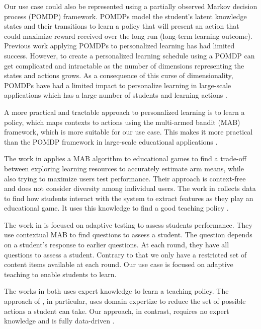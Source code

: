 \label{chapter:problem}

Our use case could also be represented using a partially observed Markov decision process (POMDP) framework. POMDPs model the student's latent knowledge states and their transitions to learn a policy that will present an action that could maximize reward received over the long run (long-term learning outcome). Previous work applying POMDPs to personalized learning has had limited success. However, to create a personalized learning schedule using a POMDP can get complicated and intractable as the number of dimensions representing the states and actions grows. As a consequence of this curse of dimensionality, POMDPs have had a limited impact to personalize learning in large-scale applications which has a large number of students and learning actions \cite{lan2016contextual}. \par 

A more practical and tractable approach to personalized learning is to learn a policy, which maps contexts to actions using the multi-armed bandit (MAB) framework, which is more suitable for our use case. This makes it more practical than the POMDP framework in large-scale educational applications \cite{lan2016contextual}. \par

The work in \cite{liu2014trading} applies a MAB algorithm to educational games to find a trade-off between exploring learning resources to accurately estimate arm means, while also trying to maximize users test performance. Their approach is context-free and does not consider diversity among individual users. The work in \cite{mandel2014offline} collects data to find how students interact with the system to extract features as they play an educational game. It uses this knowledge to find a good teaching policy \cite{lan2016contextual}. \par 

The work in \cite{lan2016contextual} is focused on adaptive testing to assess students performance. They use contextual MAB to find questions to assess a student. The question depends on a student's response to earlier questions. At each round, they have all questions to assess a student. Contrary to that we only have a restricted set of content items available at each round. Our use case is focused on adaptive teaching to enable students to learn. \par

The works in \cite{clement2013multi,koedinger2013new} both uses expert knowledge to learn a teaching policy. The approach of \cite{clement2013multi}, in particular, uses domain expertize to reduce the set of possible actions a student can take. Our approach, in contrast, requires no expert knowledge and is fully data-driven \cite{lan2016contextual}. \par

